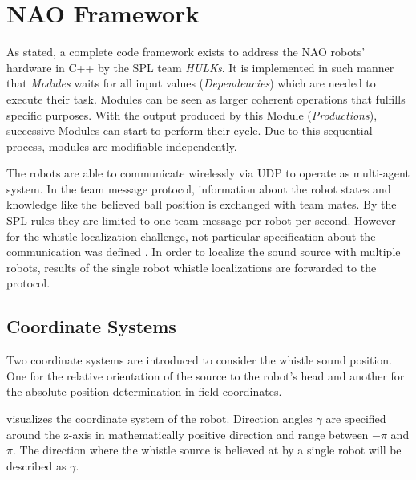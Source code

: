\section{NAO Framework}
\label{sec:03_naoFramework}

As stated, a complete code framework exists to address the NAO robots' hardware
in C++ by the \ac{SPL} team \textit{HULKs}.
It is implemented in such manner that \textit{Modules} waits for all input
values (\textit{Dependencies}) which are needed to execute their task.
Modules can be seen as larger coherent operations that fulfills specific purposes.
With the output produced by this Module (\textit{Productions}), successive
Modules can start to perform their cycle.
Due to this sequential process, modules are modifiable independently.

The robots are able to communicate wirelessly via \ac{UDP} to operate as
multi-agent system.
In the team message protocol, information about the robot states and
knowledge like the believed ball position is exchanged with team mates.
By the \ac{SPL} rules \cite{rules} they are limited to one team message per
robot per second.
However for the whistle localization challenge, not particular specification
about the communication was defined \cite{technical_challenge}.
In order to localize the sound source with multiple robots, results of the
single robot whistle localizations are forwarded to the protocol.

\subsection{Coordinate Systems}
\label{subsec:03_coordinates}

Two coordinate systems are introduced to consider the whistle sound position.
One for the relative orientation of the source to the robot's head and another
for the absolute position determination in field coordinates.

 visualizes the coordinate system of the
robot.
Direction angles $\gamma$ are specified around the z-axis in
mathematically positive direction and range between $-\pi$ and $\pi$.
The direction where the whistle source is believed at by a single robot
will be described as $\gamma$.

